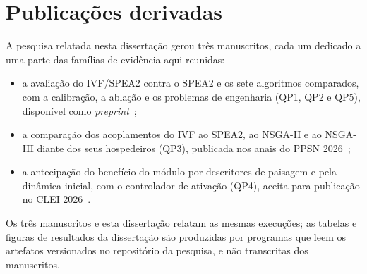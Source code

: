 \section{Publicações derivadas}
\label{sec:publicacoes}

A pesquisa relatada nesta dissertação gerou três manuscritos, cada um dedicado a uma parte das famílias de evidência aqui reunidas:

\begin{itemize}
    \item a avaliação do IVF/SPEA2 contra o SPEA2 e os sete algoritmos comparados, com a calibração, a ablação e os problemas de engenharia (QP1, QP2 e QP5), disponível como \textit{preprint}~\cite{zambrano2026ivfspea2};
    \item a comparação dos acoplamentos do IVF ao SPEA2, ao NSGA-II e ao NSGA-III diante dos seus hospedeiros (QP3), publicada nos anais do PPSN 2026~\cite{zambrano2026hosts};
    \item a antecipação do benefício do módulo por descritores de paisagem e pela dinâmica inicial, com o controlador de ativação (QP4), aceita para publicação no CLEI 2026~\cite{zambrano2026clei}.
\end{itemize}

Os três manuscritos e esta dissertação relatam as mesmas execuções; as tabelas e figuras de resultados da dissertação são produzidas por programas que leem os artefatos versionados no repositório da pesquisa, e não transcritas dos manuscritos.
